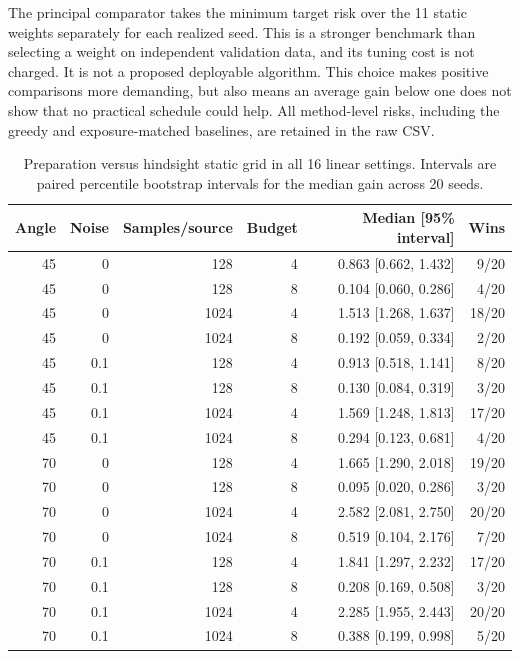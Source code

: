 The principal comparator takes the minimum target risk over the 11 static weights separately for each realized seed. This is a stronger benchmark than selecting a weight on independent validation data, and its tuning cost is not charged. It is not a proposed deployable algorithm. This choice makes positive comparisons more demanding, but also means an average gain below one does not show that no practical schedule could help. All method-level risks, including the greedy and exposure-matched baselines, are retained in the raw CSV.

\begin{table}[h]
\centering\small
\caption{Preparation versus hindsight static grid in all 16 linear settings. Intervals are paired percentile bootstrap intervals for the median gain across 20 seeds.}\label{tab:linear}
\begin{tabular}{rrrrrr}\toprule
Angle & Noise & Samples/source & Budget & Median [95\% interval] & Wins\\\midrule
45 & 0 & 128 & 4 & 0.863 [0.662, 1.432] & 9/20 \\
45 & 0 & 128 & 8 & 0.104 [0.060, 0.286] & 4/20 \\
45 & 0 & 1024 & 4 & 1.513 [1.268, 1.637] & 18/20 \\
45 & 0 & 1024 & 8 & 0.192 [0.059, 0.334] & 2/20 \\
45 & 0.1 & 128 & 4 & 0.913 [0.518, 1.141] & 8/20 \\
45 & 0.1 & 128 & 8 & 0.130 [0.084, 0.319] & 3/20 \\
45 & 0.1 & 1024 & 4 & 1.569 [1.248, 1.813] & 17/20 \\
45 & 0.1 & 1024 & 8 & 0.294 [0.123, 0.681] & 4/20 \\
70 & 0 & 128 & 4 & 1.665 [1.290, 2.018] & 19/20 \\
70 & 0 & 128 & 8 & 0.095 [0.020, 0.286] & 3/20 \\
70 & 0 & 1024 & 4 & 2.582 [2.081, 2.750] & 20/20 \\
70 & 0 & 1024 & 8 & 0.519 [0.104, 2.176] & 7/20 \\
70 & 0.1 & 128 & 4 & 1.841 [1.297, 2.232] & 17/20 \\
70 & 0.1 & 128 & 8 & 0.208 [0.169, 0.508] & 3/20 \\
70 & 0.1 & 1024 & 4 & 2.285 [1.955, 2.443] & 20/20 \\
70 & 0.1 & 1024 & 8 & 0.388 [0.199, 0.998] & 5/20 \\
\bottomrule\end{tabular}
\end{table}

